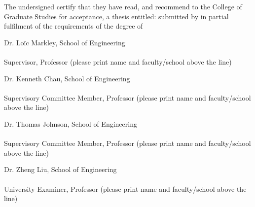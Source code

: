\makeatletter
The undersigned certify that they have read, and recommend to the College of Graduate Studies for acceptance, a thesis entitled: {\sc \@title }
submitted by {\sc \@author} in partial fulfilment of the requirements of the degree of \@degreetitle
\makeatother

\newlength{\linespace}
\setlength{\linespace}{.5cm} %
\vspace{\linespace}\smaller
Dr. Lo\"ic Markley, School of Engineering \\
\noindent\underline{\hspace{30em}} \\
Supervisor, Professor (please print name and faculty/school above the line)

\vspace{\linespace}

Dr. Kenneth Chau, School of Engineering \\
\noindent\underline{\hspace{30em}} \\
Supervisory Committee Member, Professor (please print name and faculty/school above the line)

\vspace{\linespace}

Dr. Thomas Johnson, School of Engineering \\
\noindent\underline{\hspace{30em}} \\
Supervisory Committee Member, Professor (please print name and faculty/school above the line)

\vspace{\linespace}

Dr. Zheng Liu, School of Engineering \\
\noindent\underline{\hspace{30em}} \\
University Examiner, Professor (please print name and faculty/school above the line)

\vspace{\linespace}


